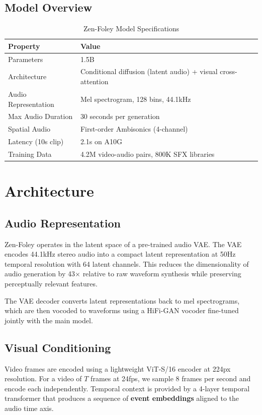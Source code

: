 \documentclass[11pt,a4paper]{article}
\begin{document}
\subsection{Model Overview}

\begin{table}[H]
\centering
\begin{tabular}{ll}
\toprule
\textbf{Property} & \textbf{Value} \\
\midrule
Parameters & 1.5B \\
Architecture & Conditional diffusion (latent audio) + visual cross-attention \\
Audio Representation & Mel spectrogram, 128 bins, 44.1kHz \\
Max Audio Duration & 30 seconds per generation \\
Spatial Audio & First-order Ambisonics (4-channel) \\
Latency (10s clip) & 2.1s on A10G \\
Training Data & 4.2M video-audio pairs, 800K SFX libraries \\
\bottomrule
\end{tabular}
\caption{Zen-Foley Model Specifications}
\end{table}

\section{Architecture}

\subsection{Audio Representation}

Zen-Foley operates in the latent space of a pre-trained audio VAE. The VAE encodes 44.1kHz
stereo audio into a compact latent representation at 50Hz temporal resolution with 64
latent channels. This reduces the dimensionality of audio generation by 43$\times$ relative
to raw waveform synthesis while preserving perceptually relevant features.

The VAE decoder converts latent representations back to mel spectrograms, which are then
vocoded to waveforms using a HiFi-GAN vocoder fine-tuned jointly with the main model.

\subsection{Visual Conditioning}

Video frames are encoded using a lightweight ViT-S/16 encoder at 224px resolution. For a
video of $T$ frames at 24fps, we sample 8 frames per second and encode each independently.
Temporal context is provided by a 4-layer temporal transformer that produces a sequence of
\textbf{event embeddings} aligned to the audio time axis.
\end{document}
